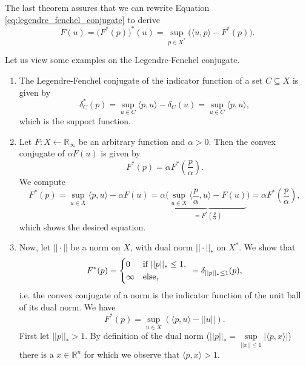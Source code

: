     The last theorem assures that we can rewrite Equation \ref{eq:legendre_fenchel_conjugate} to derive
        $$
            F(u) = \big( F^{\ast}(p) \big)^{\ast}(u) = \sup_{p \in X^{\ast}} \big( \langle u, p \rangle - F^{\ast}(p) \big).
        $$
    \begin{example}
    \label{ex:legendre_fenchel_conjugate_example}

        Let us view some examples on the Legendre-Fenchel conjugate.
        \begin{enumerate}
            \item The Legendre-Fenchel conjugate of the indicator function of a set $C \subseteq X$ is given by
                $$
                    \delta^{\ast}_{C}(p) = \sup_{u \in C} \langle p, u \rangle - \delta_{C}(u) = \sup_{u \in C} \langle p, u \rangle,
                $$
            which is the support function.
            \item Let $F: X \longleftarrow \mathbb{R}_{\infty}$ be an arbitrary function and $\alpha > 0$. Then the convex conjugate of $\alpha F(u)$ is given by
                $$
                    F^{\ast}(p) = \alpha F^{\ast}(\frac{p}{\alpha}).
                $$
            We compute
                $$
                    F^{\ast}(p) = \sup_{u \in X} \langle p, u \rangle - \alpha F(u) = \alpha \big( \underbrace{\sup_{u \in X} \langle \frac{p}{\alpha}, u \rangle - F(u)}_{= F^{\ast}(\frac{p}{\alpha})} \big) = \alpha F^{\ast}(\frac{p}{\alpha}),
                $$
            which shows the desired equation.
            \item Now, let $||\cdot||$ be a norm on $X$, with dual norm $||\cdot||_{\ast}$ on $X^{\ast}$. We show that
                $$
                    F^{\ast}(p) =
                        \begin{dcases*}
                            0 & \textnormal{if $||p||_{\ast} \le 1$,} \\
                            \infty & \textnormal{else},
                        \end{dcases*}
                    = \delta_{||p||_{\ast} \le 1}(p),
                $$
            i.e. the convex conjugate of a norm is the indicator function of the unit ball of its dual norm. We have
                $$
                    F^{\ast}(p) = \sup_{u \in X} (\langle p, u \rangle - ||u||).
                $$
            First let $||p||_{\ast} > 1$. By definition of the dual norm ($||p||_{\ast} = \sup\limits_{||x|| \le 1} |\langle p, x \rangle|$) there is a $x \in \mathbb{R}^{n}$ for which we observe that $\langle p, x \rangle > 1$.


\end{enumerate}
\end{example}
